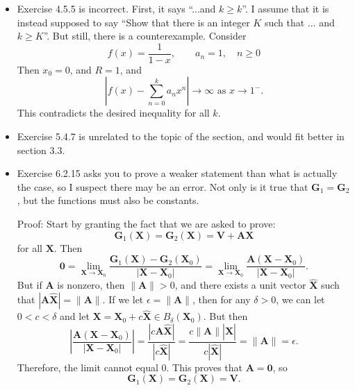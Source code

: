 \documentclass{article}
\begin{document}
\begin{itemize}

\item {
        Exercise 4.5.5 is incorrect. First, it says ``...and $k \geq k$''. I assume that it is instead supposed to say ``Show that there is an integer $K$ such that ... and $k \geq K$''. But still, there is a counterexample. Consider
    \begin{equation*}
        f(x) = \frac 1 {1 - x}, \qquad a_n = 1, \quad n \geq 0
    \end{equation*}
    Then $x_0 = 0$, and $R = 1$, and
    \begin{equation*}
        \left|f(x) - \sum_{n = 0}^k a_n x^n\right| \to \infty \text{ as } x \to 1^-.
    \end{equation*}
    This contradicts the desired inequality for all $k$.
}

\item Exercise 5.4.7 is unrelated to the topic of the section, and would fit better in section 3.3.

\item {
    Exercise 6.2.15 asks you to prove a weaker statement than what is actually the case, so I suspect there may be an error. Not only is it true that $\mathbf{G}_1 = \mathbf{G}_2$,
    but the functions must also be constants.

    Proof: Start by granting the fact that we are asked to prove:
    \begin{equation*}
        \mathbf{G}_1(\mathbf{X}) = \mathbf{G}_2(\mathbf{X}) = \mathbf{V} + \mathbf{A}\mathbf{X}
    \end{equation*}
    for all $\mathbf{X}$. Then
    \begin{equation*}
        \mathbf{0} = \lim_{\mathbf{X} \to \mathbf{X}_0} \frac{\mathbf{G}_1(\mathbf{X}) - \mathbf{G}_2(\mathbf{X}_0)}{|\mathbf{X} - \mathbf{X}_0|} = \lim_{\mathbf{X} \to \mathbf{X}_0} \frac{\mathbf{A}(\mathbf{X} - \mathbf{X}_0)}{|\mathbf{X} - \mathbf{X}_0|}.
    \end{equation*}
    But if $\mathbf{A}$ is nonzero, then $\|\mathbf{A}\| > 0$, and there exists a unit vector $\mathbf{\hat{X}}$ such that $|\mathbf{A}\mathbf{\hat{X}}| = \|\mathbf{A}\|$.
    If we let $\epsilon = \|\mathbf{A}\|$, then for any $\delta > 0$, we can let $0 < c < \delta$ and let $\mathbf{X} = \mathbf{X}_0 + c\mathbf{\hat{X}} \in B_\delta(\mathbf{X}_0)$. But then
    \begin{equation*}
        \left|\frac{\mathbf{A}(\mathbf{X} - \mathbf{X}_0)}{|\mathbf{X} - \mathbf{X}_0|}\right| = \frac{|c\mathbf{A}\mathbf{\hat{X}}|}{|c\mathbf{\hat{X}}|} = \frac{c\|\mathbf{A}\||\mathbf{\hat{X}}|}{c|\mathbf{\hat{X}}|} = \|\mathbf{A}\| = \epsilon.
    \end{equation*}
    Therefore, the limit cannot equal 0. This proves that $\mathbf{A} = \mathbf{0}$, so
    \begin{equation*}
        \mathbf{G}_1(\mathbf{X}) = \mathbf{G}_2(\mathbf{X}) = \mathbf{V}.
    \end{equation*}
}

\end{itemize}
\end{document}
